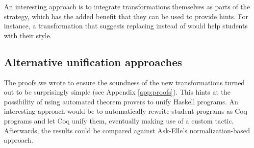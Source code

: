 An interesting approach is to integrate transformations themselves as parts of the strategy, which has the added benefit that they can be used to provide hints. For instance, a transformation that suggests replacing  instead of  would help students with their style.

\subsection{Alternative unification approaches}

The proofs we wrote to ensure the soundness of the new transformations turned out to be surprisingly simple (see Appendix \ref{app:proofs}). This hints at the possibility of using automated theorem provers to unify Haskell programs. An interesting approach would be to automatically rewrite student programs as Coq programs and let Coq unify them, eventually making use of a custom tactic. Afterwards, the results could be compared against Ask-Elle's normalization-based approach.
